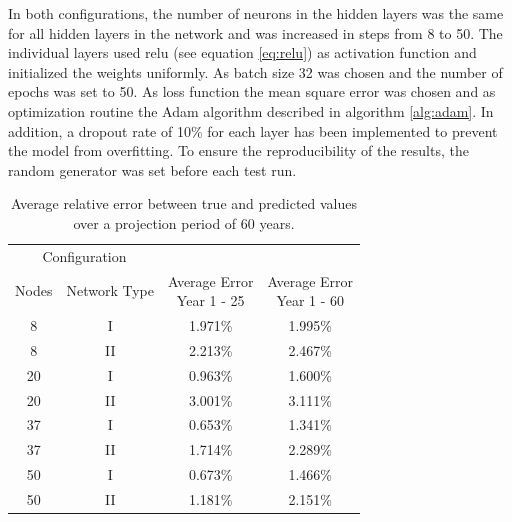 In both configurations, the number of neurons in the hidden layers was the same for all hidden layers in the network and was increased in steps from 8 to 50. The individual layers used relu (see equation \ref{eq:relu}) as activation function and initialized the weights uniformly. As batch size 32 was chosen and the number of epochs was set to 50. As loss function the mean square error was chosen and as optimization routine the Adam algorithm described in algorithm \ref{alg:adam}.  In addition, a dropout rate of 10\% for each layer has been implemented to prevent the model from overfitting. To ensure the reproducibility of the results, the random generator was set before each test run. 
\begin{table}[]
	\caption{Average relative error between true and predicted values over a projection period of 60 years.}
	\centering
	\begin{tabular}{cccc}
		\hline
		\multicolumn{2}{c}{Configuration} \\
		\cline{1-2}
		Nodes    	& Network Type 	& \thead{Average Error \\ Year 1 - 25} 	& \thead{Average Error \\ Year 1 - 60} \\
		\hline
		8      		& I			  	& 1.971\%  		& 1.995\%     		\\
		8      		& II		  	& 2.213\%    	& 2.467\%  			\\
		20      	& I			  	& 0.963\%      	& 1.600\% 			\\
		20     		& II		  	& 3.001\%      	& 3.111\% 			\\
		37      	& I			  	& 0.653\%      	& 1.341\% 			\\
		37     		& II		  	& 1.714\%      	& 2.289\% 			\\
		50      	& I			  	& 0.673\%      	& 1.466\% 			\\
		50     		& II		  	& 1.181\%      	& 2.151\% 			\\
		\hline
	\end{tabular}
	\label{tab:NN_relative_error}
\end{table}
